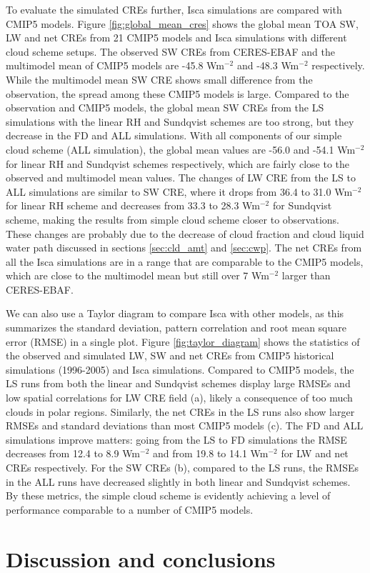 To evaluate the simulated CREs further, Isca simulations are compared with CMIP5 models. Figure \ref{fig:global_mean_cres} shows the global mean TOA SW, LW and net CREs from 21 CMIP5 models and Isca simulations with different cloud scheme setups. The observed SW CREs from CERES-EBAF and the multimodel mean of CMIP5 models are -45.8 Wm$^{-2}$ and -48.3 Wm$^{-2}$ respectively. While the multimodel mean SW CRE shows small difference from the observation, the spread among these CMIP5 models is large. Compared to the observation and CMIP5 models, the global mean SW CREs from the LS simulations with the linear RH and Sundqvist schemes are too strong, but they decrease in the FD and ALL simulations. With all components of our simple cloud scheme (ALL simulation), the global mean values are -56.0 and -54.1 Wm$^{-2}$ for linear RH and Sundqvist schemes respectively, which are fairly close to the observed and multimodel mean values. The changes of LW CRE from the LS to ALL simulations are similar to SW CRE, where it drops from 36.4 to 31.0 Wm$^{-2}$ for linear RH scheme and decreases from 33.3 to 28.3 Wm$^{-2}$ for Sundqvist scheme, making the results from simple cloud scheme closer to observations. These changes are probably due to the decrease of cloud fraction and cloud liquid water path discussed in sections \ref{sec:cld_amt} and \ref{sec:cwp}. The net CREs from all the Isca simulations are in a range that are comparable to the CMIP5 models, which are close to the multimodel mean but still over 7 Wm$^{-2}$ larger than CERES-EBAF.

We can also use a Taylor diagram \citep{Taylor2001} to compare Isca with other models, as this summarizes the standard deviation, pattern correlation and root mean square error (RMSE) in a single plot. Figure \ref{fig:taylor_diagram} shows the statistics of the observed and simulated LW, SW and net CREs from CMIP5 historical simulations (1996-2005) and Isca simulations. Compared to CMIP5 models, the LS runs from both the linear and Sundqvist schemes display large RMSEs and low spatial correlations for LW CRE field (a), likely a consequence of too much clouds in polar regions. Similarly, the net CREs in the LS runs also show larger RMSEs and standard deviations than most CMIP5 models (c). The FD and ALL simulations improve matters: going from the LS to FD simulations the RMSE decreases from 12.4 to 8.9 Wm$^{-2}$ and from 19.8 to 14.1 Wm$^{-2}$ for LW and net CREs respectively. For the SW CREs (b), compared to the LS runs, the RMSEs in the ALL runs have decreased slightly in both linear and Sundqvist schemes.  By these metrics, the  simple cloud scheme  is evidently achieving a level of performance comparable to a number of CMIP5 models.


\section{Discussion and conclusions}


